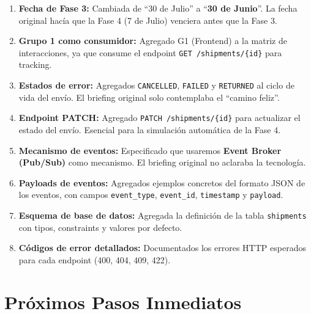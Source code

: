 \documentclass[11pt, a4paper]{article}
\begin{document}
\begin{enumerate}[label=\textcolor{danger}{\textbf{C\arabic*.}}, leftmargin=2.5em]
  \item \textbf{Fecha de Fase 3:} Cambiada de ``30 de Julio'' a
        ``\textbf{30 de Junio}''. La fecha original hacía que la Fase 4
        (7 de Julio) venciera antes que la Fase 3.

  \item \textbf{Grupo 1 como consumidor:} Agregado G1 (Frontend) a la
        matriz de interacciones, ya que consume el endpoint
        \texttt{GET /shipments/\{id\}} para tracking.

  \item \textbf{Estados de error:} Agregados \texttt{CANCELLED},
        \texttt{FAILED} y \texttt{RETURNED} al ciclo de vida del envío.
        El briefing original solo contemplaba el ``camino feliz''.

  \item \textbf{Endpoint PATCH:} Agregado
        \texttt{PATCH /shipments/\{id\}} para actualizar el estado del
        envío. Esencial para la simulación automática de la Fase 4.

  \item \textbf{Mecanismo de eventos:} Especificado que usaremos
        \textbf{Event Broker (Pub/Sub)} como mecanismo. El briefing
        original no aclaraba la tecnología.

  \item \textbf{Payloads de eventos:} Agregados ejemplos concretos del
        formato JSON de los eventos, con campos \texttt{event\_type},
        \texttt{event\_id}, \texttt{timestamp} y \texttt{payload}.

  \item \textbf{Esquema de base de datos:} Agregada la definición de la
        tabla \texttt{shipments} con tipos, constraints y valores por
        defecto.

  \item \textbf{Códigos de error detallados:} Documentados los errores
        HTTP esperados para cada endpoint (400, 404, 409, 422).
\end{enumerate}


\section{Próximos Pasos Inmediatos}
\end{document}
